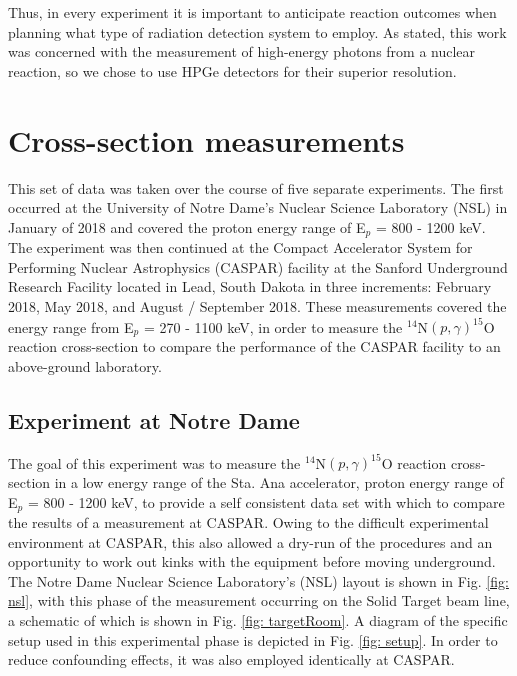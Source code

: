 Thus, in every experiment it is important to anticipate reaction outcomes when planning what type of radiation detection system to employ. As stated, this work was concerned with the measurement of high-energy photons from a nuclear reaction, so we chose to use HPGe detectors for their superior resolution.




\section{Cross-section measurements}
\label{sec: cs experiment}

This set of data was taken over the course of five separate experiments. The first occurred at the University of Notre Dame's Nuclear Science Laboratory (NSL) in January of 2018 and covered the proton energy range of E$_{p}$ = 800 - 1200 keV. The experiment was then continued at the Compact Accelerator System for Performing Nuclear Astrophysics (CASPAR) facility at the Sanford Underground Research Facility located in Lead, South Dakota in three increments: February 2018, May 2018, and August / September 2018. These measurements covered the energy range from E$_{p}$ = 270 - 1100 keV, in order to measure the $^{14}$N$\left( p,\gamma \right) ^{15}$O reaction cross-section to compare the performance of the CASPAR facility to an above-ground laboratory.


\subsection{Experiment at Notre Dame}
\label{sec: expND}

The goal of this experiment was to measure the $^{14}$N$\left( p,\gamma \right) ^{15}$O reaction cross-section in a low energy range of the Sta. Ana accelerator, proton energy range of E$_{p}$ = 800 - 1200 keV, to provide a self consistent data set with which to compare the results of a measurement at CASPAR. Owing to the difficult experimental environment at CASPAR, this also allowed a dry-run of the procedures and an opportunity to work out kinks with the equipment before moving underground. The Notre Dame Nuclear Science Laboratory's (NSL) layout is shown in Fig. \ref{fig: nsl}, with this phase of the measurement occurring on the Solid Target beam line, a schematic of which is shown in Fig. \ref{fig: targetRoom}. A diagram of the specific setup used in this experimental phase is depicted in Fig. \ref{fig: setup}. In order to reduce confounding effects, it was also employed identically at CASPAR. 


